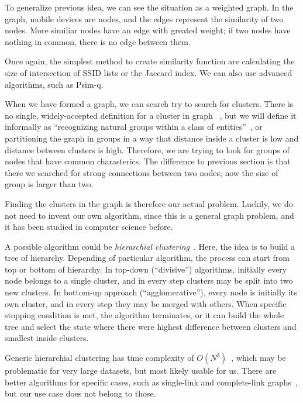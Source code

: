 \documentclass[12pt,a4paper,oneside,pdftex]{report}
\begin{document}
To generalize previous idea, we can see the situation as a weighted graph. In the graph, mobile devices are nodes, and the edges represent the similarity of two nodes. More similiar nodes have an edge with greated weight; if two nodes have nothing in common, there is no edge between them.

Once again, the simplest method to create similarity function are calculating the size of intersection of SSID lists or the Jaccard index. We can also use advanced algorithms, such as Psim-q.

When we have formed a graph, we can search try to search for clusters. There is no single, widely-accepted definition for a cluster in graph~\cite{schaeffer2007graph} , but we will define it informally as ``recognizing natural groups within a class of entities''~\cite{van2000graph}, or partitioning the graph in groups in a way that distance inside a cluster is low and distance between clusters is high. Therefore, we are trying to look for groups of nodes that have common charasterics. The difference to previous section is that there we searched for strong connections between two nodes; now the size of group is larger than two.

Finding the clusters in the graph is therefore our actual problem. Luckily, we do not need to invent our own algorithm, since this is a general graph problem, and it has been studied in computer science before.

A possible algorithm could be \emph{hierarchial clustering}~\cite{schaeffer2007graph}. Here, the idea is to build a tree of hierarchy. Depending of particular algorithm, the process can start from top or bottom of hierarchy. In top-down (``divisive'') algorithms, initially every node belongs to a single cluster, and in every step clusters may be split into two new clusters. In bottom-up approach (``agglomerative''), every node is initially its own cluster, and in every step they may be merged with others. When specific stopping condition is met, the algorithm terminates, or it can build the whole tree and select the state where there were highest difference between clusters and smallest inside clusters.

Generic hierarchial clustering has time complexity of $O(N^3)$~\cite{manning2008introduction}, which may be problematic for very large datasets, but most likely usable for us. There are better algorithms for specific cases, such as single-link and complete-link graphs~\cite{manning2008introduction}, but our use case does not belong to those. 
\end{document}
